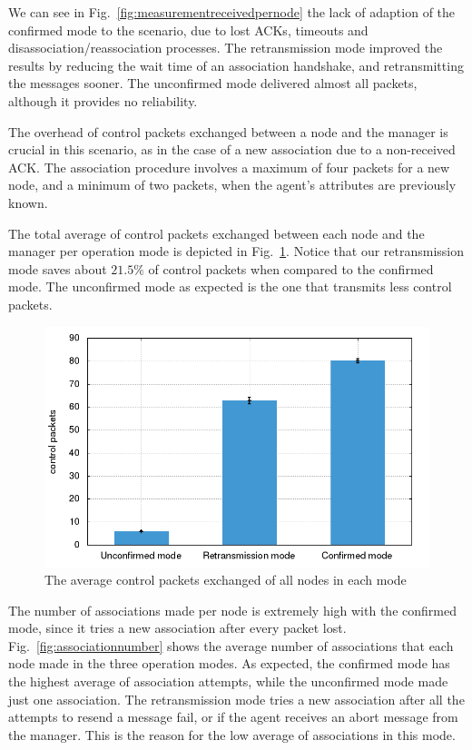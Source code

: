 We can see in Fig.~\ref{fig:measurementreceivedpernode} the lack of adaption of the confirmed mode to the scenario, due to lost ACKs, timeouts and disassociation/reassociation processes. The retransmission mode improved the results by reducing the wait time of an association handshake, and retransmitting the messages sooner. The unconfirmed mode delivered almost all packets, although it provides no reliability.

The overhead of control packets exchanged between a node and the manager is crucial in this scenario, as in the case of a new association due to a non-received ACK. The association procedure involves a maximum of four packets for a new node, and a minimum of two packets, when the agent's attributes are previously known.

The total average of control packets exchanged between each node and the manager per operation mode is depicted in Fig.~\ref{fig:controlpacketsexchanged}. Notice that our retransmission mode saves about $21.5\%$ of control packets when compared to the confirmed mode. The unconfirmed mode as expected is the one that transmits less control packets.

\begin{figure}[htbp]
\centerline{\includegraphics[scale=0.4]{figures/averagecontrolpacketsexchanged.png}}
\caption{The average control packets exchanged of all nodes in each mode}
\label{fig:controlpacketsexchanged}
\end{figure}

The number of associations made per node is extremely high with the confirmed mode, since it tries a new association after every packet lost. Fig.~\ref{fig:associationnumber} shows the average number of associations that each node made in the three operation modes. As expected, the confirmed mode has the highest average of association attempts, while the unconfirmed mode made just one association. The retransmission mode tries a new association after all the attempts to resend a message fail, or if the agent receives an abort message from the manager. This is the reason for the low average of associations in this mode.   

